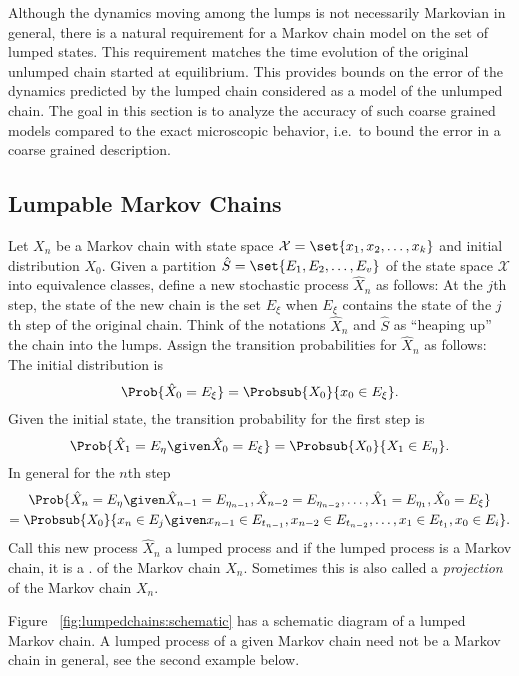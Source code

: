 \documentclass[12pt]{article}
\begin{document}
Although the dynamics moving among the lumps is not necessarily
Markovian in general, there is a natural requirement for a Markov chain
model on the set of lumped states.  This requirement matches the time
evolution of the original unlumped chain started at equilibrium.  This
provides bounds on the error of the dynamics predicted by the lumped
chain considered as a model of the unlumped chain.  The goal in this
section is to analyze the accuracy of such coarse grained models
compared to the exact microscopic behavior, i.e.\ to bound the error in
a coarse grained description.

\subsection*{Lumpable Markov Chains}


\begin{definition}
    Let \( X_n \) be a Markov chain with state space \( \mathcal{X} =
    \set{x_1, x_2, \dots, x_k} \) and initial distribution \( X_0 \).
    Given a partition \( \hat{S} = \set{E_1, E_2, \dots, E_v} \) of the
    state space \( \mathcal{X} \) into equivalence classes, define a new
    stochastic process \( \hat{X}_n \) as follows:  At the \( j \)th
    step, the state of the new chain is the set \( E_{\xi} \) when \( E_
    {\xi} \) contains the state of the \( j \)th step of the original
    chain.  Think of the notations \( \hat{X}_n \) and \( \hat{S} \) as
    ``heaping up'' the chain into the lumps.  Assign the transition
    probabilities for \( \hat{X}_n \) as follows:  The initial
    distribution is
    \[
        \Prob{\hat{X}_0 = E_{\xi}} = \Probsub{X_0}{x_0 \in E_{\xi}}.
    \] Given the initial state, the transition probability for the first
    step is
    \[
        \Prob{\hat{X}_1 = E_{\eta} \given \hat{X}_0 = E_{\xi}} =
        \Probsub{X_0}{X_1 \in E_{\eta} }.
    \] In general for the \( n \)th step
    \begin{multline*}
        \Prob{\hat{X}_n = E_{\eta} \given \hat{X}_{n-1} = E_{\eta_{n-1}},
        \hat{X}_ {n-2} = E_{\eta_{n-2}}, \dots, \hat{X}_1 = E_{\eta_1},
        \hat{X}_0 = E_\xi}\\
        = \Probsub{X_0}{x_n \in E_j \given x_{n-1} \in E_{t_{n-1}}, x_{n-2}
        \in E_{t_{n-2}}, \dots, x_1 \in E_{t_1}, x_0 \in E_i}.
    \end{multline*}
    Call this new process \( \hat{X}_n \) a lumped process and if the
    lumped process is a Markov chain, it is a .%
    of the Markov chain \( X_n \).  Sometimes this is also called a
    \emph{projection} of the Markov chain \( X_n \).%
\end{definition}
Figure~%
\ref{fig:lumpedchains:schematic} has a schematic diagram of a lumped
Markov chain. A lumped process of a given Markov chain need not be a
Markov chain in general, see the second example below.
\end{document}
